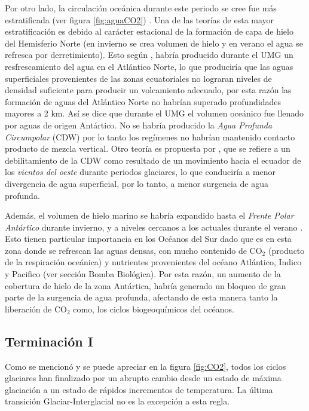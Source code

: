 Por otro lado, la circulación oceánica durante este periodo se cree fue más estratificada (ver figura \ref{fig:aguaCO2}) \citep{sigman2000glacial,lynch2007atlantic,tagliabue2009quantifying,ferrari2014antarctic}. Una de las teorías de esta mayor estratificación es debido al carácter estacional de la formación de capa de hielo del Hemisferio Norte (en invierno se crea volumen de hielo y en verano el agua se refresca por derretimiento). Esto según \cite{ferrari2014antarctic}, habría producido durante el UMG un resfrescamiento del agua en el Atlántico Norte, lo que produciría que las aguas superficiales provenientes de las zonas ecuatoriales no lograran niveles de densidad suficiente para producir un volcamiento adecuado, por esta razón las formación de aguas del Atlántico Norte no habrían superado profundidades mayores a 2 km. Así se dice que durante el UMG el volumen oceánico fue llenado por aguas de origen Antártico. No se habría producido la \textit{Agua Profunda Circumpolar} (CDW) por lo tanto los regímenes no habrían mantenido contacto producto de mezcla vertical. Otro teoría es propuesta por \cite{toggweiler2006midlatitude}, que se refiere a un debilitamiento de la CDW como resultado de un movimiento hacia el ecuador de los \textit{vientos del oeste} durante periodos glaciares, lo que conduciría a menor divergencia de agua superficial, por lo tanto, a menor surgencia de agua profunda. 

 Además, el volumen de hielo marino se habría expandido hasta el \textit{Frente Polar Antártico} durante invierno, y a niveles cercanos a los actuales durante el verano \citep{bopp2003dust}. Esto tienen particular importancia en los Océanos del Sur dado que es en esta zona donde se refrescan las aguas densas, con mucho contenido de CO$_2$ (producto de la respiración oceánica) y nutrientes provenientes del océano Atlántico, Indico y Pacifico (ver sección Bomba Biológica). Por esta razón, un aumento de la cobertura de hielo de la zona Antártica, habría generado un bloqueo de gran parte de la surgencia de agua profunda, afectando de esta manera tanto la liberación de CO$_2$ como, los ciclos biogeoquímicos del océanos. 

\subsection{Terminación I}

Como se mencionó y se puede apreciar en la figura \ref{fig:CO2}, todos los ciclos glaciares han finalizado por un abrupto cambio desde un estado de máxima glaciación a un estado de rápidos incrementos de temperatura. La última transición Glaciar-Interglacial no es la excepción a esta regla. 

